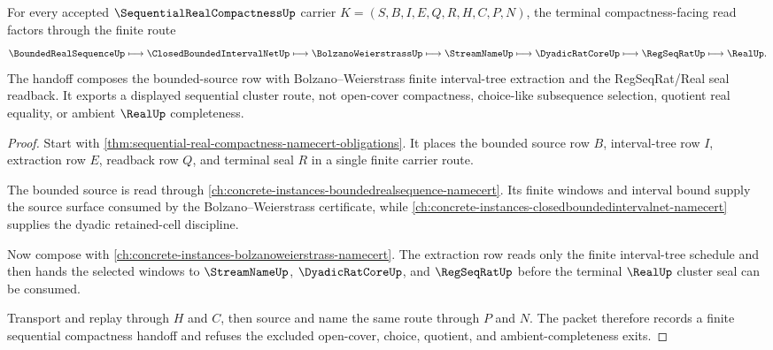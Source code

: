 \begin{theorem}
\label{thm:sequential-real-compactness-bolzano-weierstrass-handoff}
For every accepted $\SequentialRealCompactnessUp$ carrier $K=(S,B,I,E,Q,R,H,C,P,N)$, the terminal compactness-facing read factors through the finite route
$$
\BoundedRealSequenceUp \longmapsto \ClosedBoundedIntervalNetUp \longmapsto \BolzanoWeierstrassUp \longmapsto \StreamNameUp \longmapsto \DyadicRatCoreUp \longmapsto \RegSeqRatUp \longmapsto \RealUp .
$$
The handoff composes the bounded-source row with Bolzano--Weierstrass finite interval-tree extraction and the RegSeqRat/Real seal readback. It exports a displayed sequential cluster route, not open-cover compactness, choice-like subsequence selection, quotient real equality, or ambient $\RealUp$ completeness.
\end{theorem}
\begin{proof}
Start with \autoref{thm:sequential-real-compactness-namecert-obligations}. It places the bounded source row $B$, interval-tree row $I$, extraction row $E$, readback row $Q$, and terminal seal $R$ in a single finite carrier route.

The bounded source is read through \autoref{ch:concrete-instances-boundedrealsequence-namecert}. Its finite windows and interval bound supply the source surface consumed by the Bolzano--Weierstrass certificate, while \autoref{ch:concrete-instances-closedboundedintervalnet-namecert} supplies the dyadic retained-cell discipline.

Now compose with \autoref{ch:concrete-instances-bolzanoweierstrass-namecert}. The extraction row reads only the finite interval-tree schedule and then hands the selected windows to $\StreamNameUp$, $\DyadicRatCoreUp$, and $\RegSeqRatUp$ before the terminal $\RealUp$ cluster seal can be consumed.

Transport and replay through $H$ and $C$, then source and name the same route through $P$ and $N$. The packet therefore records a finite sequential compactness handoff and refuses the excluded open-cover, choice, quotient, and ambient-completeness exits.
\end{proof}


